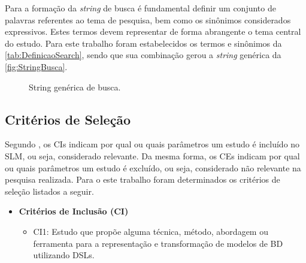 Para a formação da \textit{string} de busca é fundamental definir um conjunto de palavras referentes ao tema de pesquisa, bem como os sinônimos considerados expressivos. 
Estes termos devem representar de forma abrangente o tema central do estudo. 
Para este trabalho foram estabelecidos os termos e sinônimos da \autoref{tab:DefinicaoSearch}, sendo que sua combinação gerou a \textit{string} genérica da \autoref{fig:StringBusca}.
        
\begin{figure}[htb]
    \caption{String genérica de busca.}
    \centering
    \small
    \label{fig:StringBusca}
\end{figure}
        
    \subsection{Critérios de Seleção} \label{ssec:CritSelecao}
    
Segundo , os \acp{CI} indicam por qual ou quais parâmetros um estudo é incluído no \ac{SLM}, ou seja, considerado relevante. 
Da mesma forma, os \acp{CE} indicam por qual ou quais parâmetros um estudo é excluído, ou seja, considerado não relevante na pesquisa realizada. 
Para o este trabalho foram determinados os critérios de seleção listados a seguir.


\begin{itemize}
    \item \textbf{Critérios de Inclusão (\ac{CI})}
    \begin{itemize}
        \item CI1: Estudo que propõe alguma técnica, método, abordagem ou ferramenta para a representação e transformação de modelos de \ac{BD} utilizando \acp{DSL}.
    \end{itemize}
\end{itemize}

